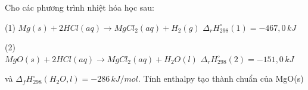 \documentclass[Main.tex]{subfiles}
\begin{document}
	\begin{bt}
		Cho các phương trình nhiệt hóa học sau:
		
		(1) $Mg(s) + 2HCl(aq) \longrightarrow MgCl_2(aq) + H_2(g)\,\, \Delta_r H_{298}^\circ (1) = -467{,}0\, kJ$
		
		(2) $MgO(s) + 2HCl(aq) \longrightarrow MgCl_2(aq) + H_2O(l)\,\, \Delta_r H_{298}^\circ (2) = -151{,}0\, kJ$
		
		và $\Delta_f H_{298}^\circ (H_2O, l) = -286\, kJ/mol$. Tính enthalpy tạo thành chuẩn của MgO(s)
	\end{bt}
\end{document}
